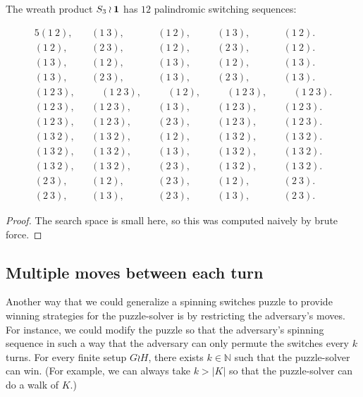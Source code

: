 \begin{proposition}
  The wreath product $S_3 \wr \bf{1}$ has $12$ palindromic switching sequences:
  \begin{singlespace}
  \begin{alignat*}{5}
    (1~2), && (1~3), && (1~2), && (1~3), && (1~2). \\
    (1~2), && (2~3), && (1~2), && (2~3), && (1~2). \\
    (1~3), && (1~2), && (1~3), && (1~2), && (1~3). \\
    (1~3), && (2~3), && (1~3), && (2~3), && (1~3). \\
    (1~2~3), && \hspace{1em} (1~2~3), && \hspace{1em} (1~2), && \hspace{1em} (1~2~3), && \hspace{1em} (1~2~3). \\
    (1~2~3), && (1~2~3), && (1~3), && (1~2~3), && (1~2~3). \\
    (1~2~3), && (1~2~3), && (2~3), && (1~2~3), && (1~2~3). \\
    (1~3~2), && (1~3~2), && (1~2), && (1~3~2), && (1~3~2). \\
    (1~3~2), && (1~3~2), && (1~3), && (1~3~2), && (1~3~2). \\
    (1~3~2), && (1~3~2), && (2~3), && (1~3~2), && (1~3~2). \\
    (2~3), && (1~2), && (2~3), && (1~2), && (2~3). \\
    (2~3), && (1~3), && (2~3), && (1~3), && (2~3).
  \end{alignat*}
  \end{singlespace}
\end{proposition}
\begin{proof}
  The search space is small here, so this was computed naively by brute force.
\end{proof}
\subsection{Multiple moves between each turn}
Another way that we could generalize a spinning switches puzzle to provide
winning strategies for the puzzle-solver is by restricting the adversary's
moves.
For instance, we could modify the puzzle so that the adversary's spinning
sequence in such a way that the adversary can only permute the switches
every $k$ turns.
For every finite setup $G \wr H$, there exists $k \in \mathbb N$ such that the
puzzle-solver can win.
(For example, we can always take $k > |K|$ so that the puzzle-solver can
do a walk of $K$.)

